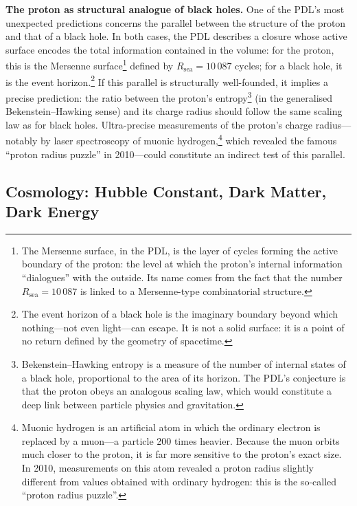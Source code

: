 \documentclass[12pt, a4paper, openright]{book}
\begin{document}
\textbf{The proton as structural analogue of black holes.} One of the PDL's most unexpected predictions concerns the parallel between the structure of the proton and that of a black hole. In both cases, the PDL describes a closure whose active surface encodes the total information contained in the volume: for the proton, this is the Mersenne surface\footnote{The Mersenne surface, in the PDL, is the layer of cycles forming the active boundary of the proton: the level at which the proton's internal information ``dialogues'' with the outside. Its name comes from the fact that the number $R_\text{sea} = 10\,087$ is linked to a Mersenne-type combinatorial structure.} defined by $R_\text{sea} = 10\,087$ cycles; for a black hole, it is the event horizon.\footnote{The event horizon of a black hole is the imaginary boundary beyond which nothing---not even light---can escape. It is not a solid surface: it is a point of no return defined by the geometry of spacetime.} If this parallel is structurally well-founded, it implies a precise prediction: the ratio between the proton's entropy\footnote{Bekenstein--Hawking entropy is a measure of the number of internal states of a black hole, proportional to the area of its horizon. The PDL's conjecture is that the proton obeys an analogous scaling law, which would constitute a deep link between particle physics and gravitation.} (in the generalised Bekenstein--Hawking sense) and its charge radius should follow the same scaling law as for black holes. Ultra-precise measurements of the proton's charge radius---notably by laser spectroscopy of muonic hydrogen,\footnote{Muonic hydrogen is an artificial atom in which the ordinary electron is replaced by a muon---a particle 200 times heavier. Because the muon orbits much closer to the proton, it is far more sensitive to the proton's exact size. In 2010, measurements on this atom revealed a proton radius slightly different from values obtained with ordinary hydrogen: this is the so-called ``proton radius puzzle''.} which revealed the famous ``proton radius puzzle'' in 2010---could constitute an indirect test of this parallel.

\subsection*{Cosmology: Hubble Constant, Dark Matter, Dark Energy}
\end{document}
